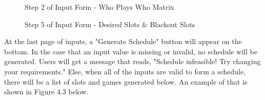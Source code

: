 \documentclass[book]{hmcclinic}
\begin{document}
\begin{figure}[h]
    \centering
    \caption{Step 2 of Input Form - Who Plays Who Matrix}
\end{figure}

\begin{figure}[h]
    \centering
    \caption{Step 5 of Input Form - Desired Slots & Blackout Slots}
\end{figure}

At the last page of inputs, a "Generate Schedule" button will appear on the bottom. In the case that an input value is missing or invalid, no schedule will be generated. Users will get a message that reads, "Schedule infeasible! Try changing your requirements." Else, when all of the inputs are valid to form a schedule, there will be a list of slots and games generated below. An example of that is shown in Figure 4.3 below. 
\end{document}
